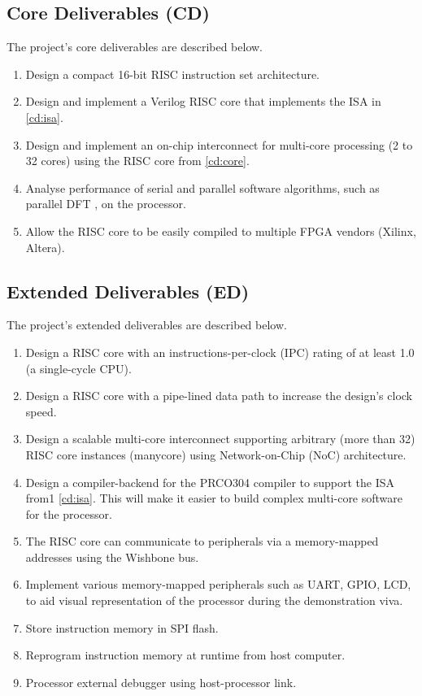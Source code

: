 \documentclass[11pt,a4paper]{report}
\begin{document}
{\subsection{Core Deliverables (CD)}
The project's core deliverables are described below.
\begin{enumerate}[leftmargin=2\parindent, label=\bfseries CD\arabic*]
    \item{Design a compact 16-bit RISC instruction set architecture.}\label{cd:isa}
    \item{Design and implement a Verilog RISC core that implements the ISA in \ref{cd:isa}.}\label{cd:core}
    \item{Design and implement an on-chip interconnect for multi-core processing (2 to 32 cores) using the RISC core from \ref{cd:core}.}\label{cd:interconnect}
    \item{Analyse performance of serial and parallel software algorithms, such as parallel DFT \cite{dft}, on the processor.}\label{cd:software}
    \item{Allow the RISC core to be easily compiled to multiple FPGA vendors (Xilinx, Altera).}\label{cd:vendor}
\end{enumerate}

\subsection{Extended Deliverables (ED)}
The project's extended deliverables are described below.
\begin{enumerate}[leftmargin=2\parindent, label=\bfseries ED\arabic*]
    \item{Design a RISC core with an instructions-per-clock (IPC) rating of at least 1.0 (a single-cycle CPU).}\label{ed:ipc}
    \item{Design a RISC core with a pipe-lined data path to increase the design's clock speed.}\label{ed:pipeline}
    \item{Design a scalable multi-core interconnect supporting arbitrary (more than 32) RISC core instances (manycore) using Network-on-Chip (NoC) architecture.}\label{ed:scale}
    \item{Design a compiler-backend for the PRCO304 \cite{prco304} compiler to support the ISA from1 \ref{cd:isa}. This will make it easier to build complex multi-core software for the processor.}\label{ed:compiler}
    \item{The RISC core can communicate to peripherals via a memory-mapped addresses using the Wishbone \cite{wishbone} bus.}\label{ed:mmu}
    \item{Implement various memory-mapped peripherals such as UART, GPIO, LCD, to aid visual representation of the processor during the demonstration viva.}\label{ed:peripherals} 
    \item{Store instruction memory in SPI flash.}\label{ed:flash}
    \item{Reprogram instruction memory at runtime from host computer.}\label{ed:program}
    \item{Processor external debugger using host-processor link.}\label{ed:debug}
\end{enumerate}

}
\end{document}
